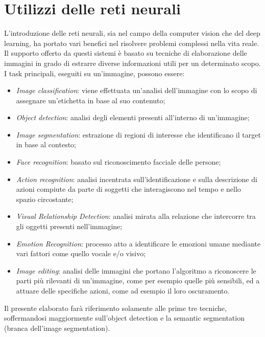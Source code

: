 \section{Utilizzi delle reti neurali}
L’introduzione delle reti neurali, sia nel campo della computer vision che del deep 
learning, ha portato vari benefici nel risolvere problemi complessi nella vita reale. 
Il supporto offerto da questi sistemi è basato su tecniche di elaborazione delle 
immagini in grado di estrarre diverse informazioni utili per un determinato scopo. 
I task principali, eseguiti su un’immagine, possono essere:
\begin{itemize}
    \item \emph{Image classification}: viene effettuata un’analisi dell’immagine con lo scopo 
    di assegnare un’etichetta in base al suo contenuto;
    \item \emph{Object detection}: analisi degli elementi presenti all’interno di un’immagine;
    \item \emph{Image segmentation}: estrazione di regioni di interesse che identificano il 
    target in base al contesto;
    \item \emph{Face recognition}: basato sul riconoscimento facciale delle persone;
    \item \emph{Action recognition}: analisi incentrata sull’identificazione e sulla descrizione 
    di azioni compiute da parte di soggetti che interagiscono nel tempo e nello 
    spazio circostante;
    \item \emph{Visual Relationship Detection}: analisi mirata alla relazione che intercorre 
    tra gli oggetti presenti nell’immagine;
    \item \emph{Emotion Recognition}: processo atto a identificare le emozioni umane mediante 
    vari fattori come quello vocale e/o visivo;
    \item \emph{Image editing}: analisi delle immagini che portano l’algoritmo a riconoscere 
    le parti più rilevanti di un’immagine, come per esempio quelle più sensibili, 
    ed a attuare delle specifiche azioni, come ad esempio il loro oscuramento.
\end{itemize}
Il presente elaborato farà riferimento solamente alle prime tre tecniche, soffermandosi 
maggiormente sull’object detection e la semantic segmentation (branca 
dell’image segmentation).

